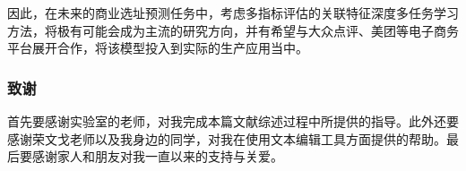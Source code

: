 \documentclass{llncs}
\begin{document}
因此，在未来的商业选址预测任务中，考虑多指标评估的关联特征深度多任务学习方法，将极有可能会成为主流的研究方向，并有希望与大众点评、美团等电子商务平台展开合作，将该模型投入到实际的生产应用当中。


\subsubsection*{致谢}
首先要感谢实验室的老师，对我完成本篇文献综述过程中所提供的指导。此外还要感谢荣文戈老师以及我身边的同学，对我在使用文本编辑工具方面提供的帮助。最后要感谢家人和朋友对我一直以来的支持与关爱。


%

	
\end{document}
